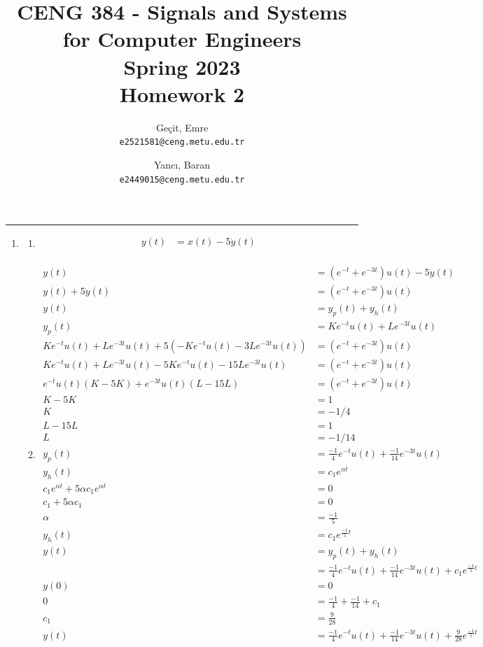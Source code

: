\documentclass[10pt,a4paper, margin=1in]{article}
\author{
  Geçit, Emre\\
  \texttt{e2521581@ceng.metu.edu.tr}
  \and
  Yancı, Baran\\
  \texttt{e2449015@ceng.metu.edu.tr}
}
\title{CENG 384 - Signals and Systems for Computer Engineers \\
Spring 2023 \\
Homework 2}
\begin{document}
\maketitle



\noindent\rule{19cm}{1.2pt}

\begin{enumerate}

\item %
    \begin{enumerate}
    \item %
    \begin{align*}
        y(t) & = x(t) - 5 \dot{y}(t) \\
    \end{align*}
    \item %
    \begin{align*}
        y(t) & = (e^{-t} + e^{-3t})u(t) - 5 \dot{y}(t) \\
        y(t) + 5 \dot{y}(t) & = (e^{-t} + e^{-3t})u(t) \\
        y(t) & = y_p(t) + y_h(t) \\
        y_p(t) & = Ke^{-t}u(t) + Le^{-3t}u(t) \\
        Ke^{-t}u(t) + Le^{-3t}u(t) + 5 (-Ke^{-t}u(t) -3Le^{-3t}u(t)) & = (e^{-t} + e^{-3t})u(t) \\
        Ke^{-t}u(t) + Le^{-3t}u(t) - 5Ke^{-t}u(t) - 15Le^{-3t}u(t) & = (e^{-t} + e^{-3t})u(t) \\
        e^{-t}u(t) (K - 5K) + e^{-3t}u(t) (L - 15L) & = (e^{-t} + e^{-3t})u(t) \\
        K - 5K & = 1 \\
        K & = - 1/4 \\
        L - 15L & = 1 \\
        L & = - 1/14 \\
        y_p(t) & = \frac{-1}{4}e^{-t}u(t) + \frac{-1}{14}e^{-3t}u(t) \\
        y_h(t) & = c_1e^{\alpha t} \\
        c_1e^{\alpha t} + 5\alpha c_1e^{\alpha t} & = 0 \\
        c_1 + 5\alpha c_1 & = 0 \\
        \alpha & = \frac{-1}{5} \\
        y_h(t) & = c_1e^{\frac{-1}{5}t} \\
        y(t) & = y_p(t) + y_h(t) \\
        & = \frac{-1}{4}e^{-t}u(t) + \frac{-1}{14}e^{-3t}u(t) + c_1e^{\frac{-1}{5}t} \\
        y(0) & = 0 \\
        0 & = \frac{-1}{4} + \frac{-1}{14} + c_1 \\
        c_1 & = \frac{9}{28} \\
        y(t) & = \frac{-1}{4}e^{-t}u(t) + \frac{-1}{14}e^{-3t}u(t) + \frac{9}{28}e^{\frac{-1}{5}t} \\
    \end{align*}
    \end{enumerate}


\end{enumerate}
\end{document}

